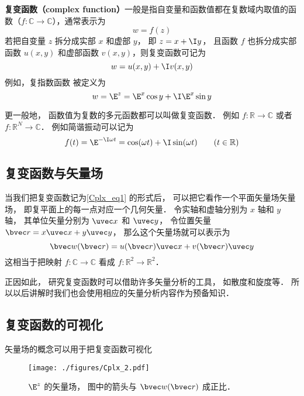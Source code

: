 
\textbf{复变函数（complex function）}一般是指自变量和函数值都在复数域内取值的函数（$f:\mathbb C \to \mathbb C$），通常表示为
\begin{equation}
w = f(z)
\end{equation}
若把自变量 $z$ 拆分成实部 $x$ 和虚部 $y$， 即 $z = x + \I y$， 且函数 $f$ 也拆分成实部函数 $u(x,y)$ 和虚部函数 $v(x,y)$，则复变函数可记为
\begin{equation}\label{Cplx_eq1}
w = u(x,y) + \I v(x,y)
\end{equation}
例如，复指数函数 被定义为
\begin{equation}\label{Cplx_eq3}
w = \E^z = \E^x \cos y + \I \E^x\sin y
\end{equation}


更一般地， 函数值为复数的多元函数都可以叫做复变函数． 例如 $f: \mathbb R \to \mathbb C$ 或者 $f:\mathbb R^N \to \mathbb C$． 例如简谐振动可以记为
\begin{equation}
f(t) = \E^{-\I \omega t} = \cos(\omega t) + \I \sin(\omega t) \qquad (t \in \mathbb R)
\end{equation}

\subsection{复变函数与矢量场}
当我们把复变函数记为\autoref{Cplx_eq1} 的形式后， 可以把它看作一个平面矢量场矢量场， 即复平面上的每一点对应一个几何矢量． 令实轴和虚轴分别为 $x$ 轴和 $y$ 轴， 其单位矢量分别为 $\uvec x$ 和 $\uvec y$， 令位置矢量 $\bvec r = x \uvec x + y \uvec y$， 那么这个矢量场就可以表示为
\begin{equation}
\bvec w(\bvec r) = u(\bvec r) \uvec x + v(\bvec r) \uvec y
\end{equation}
这相当于把映射 $f:\mathbb C \to \mathbb C$ 看成 $f: \mathbb R^2 \to \mathbb R^2$．

正因如此， 研究复变函数时可以借助许多矢量分析的工具， 如散度和旋度等． 所以以后讲解时我们也会使用相应的矢量分析内容作为预备知识．

\subsection{复变函数的可视化}
矢量场的概念可以用于把复变函数可视化
\begin{figure}[ht]
\centering
\texttt{[image: ./figures/Cplx\_2.pdf]}
\caption{$\E^z$ 的矢量场， 图中的箭头与 $\bvec w(\bvec r)$ 成正比．} \label{Cplx_fig2}
\end{figure}

